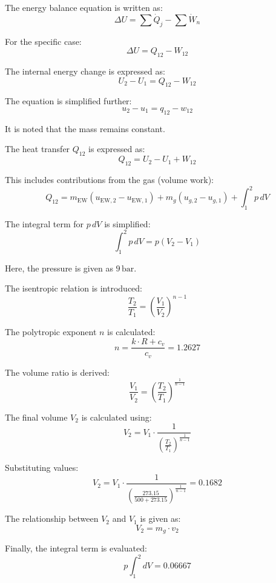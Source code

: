 The energy balance equation is written as:  
\[
\Delta U = \sum \dot{Q}_j - \sum \dot{W}_n
\]  

For the specific case:  
\[
\Delta U = Q_{12} - W_{12}
\]  

The internal energy change is expressed as:  
\[
U_2 - U_1 = Q_{12} - W_{12}
\]  

The equation is simplified further:  
\[
u_2 - u_1 = q_{12} - w_{12}
\]  

It is noted that the mass remains constant.  

The heat transfer \( Q_{12} \) is expressed as:  
\[
Q_{12} = U_2 - U_1 + W_{12}
\]  

This includes contributions from the gas (volume work):  
\[
Q_{12} = m_{\text{EW}} (u_{\text{EW},2} - u_{\text{EW},1}) + m_g (u_{g,2} - u_{g,1}) + \int_{1}^{2} p \, dV
\]  

The integral term for \( p \, dV \) is simplified:  
\[
\int_{1}^{2} p \, dV = p (V_2 - V_1)
\]  

Here, the pressure is given as \( 9 \, \text{bar} \).  

The isentropic relation is introduced:  
\[
\frac{T_2}{T_1} = \left( \frac{V_1}{V_2} \right)^{n-1}
\]  

The polytropic exponent \( n \) is calculated:  
\[
n = \frac{k \cdot R + c_v}{c_v} = 1.2627
\]  

The volume ratio is derived:  
\[
\frac{V_1}{V_2} = \left( \frac{T_2}{T_1} \right)^{\frac{1}{n-1}}
\]  

The final volume \( V_2 \) is calculated using:  
\[
V_2 = V_1 \cdot \frac{1}{\left( \frac{T_2}{T_1} \right)^{\frac{1}{n-1}}}
\]  

Substituting values:  
\[
V_2 = V_1 \cdot \frac{1}{\left( \frac{273.15}{500 + 273.15} \right)^{\frac{1}{n-1}}} = 0.1682
\]  

The relationship between \( V_2 \) and \( V_1 \) is given as:  
\[
V_2 = m_g \cdot v_2
\]  

Finally, the integral term is evaluated:  
\[
p \int_{1}^{2} dV = 0.06667
\]